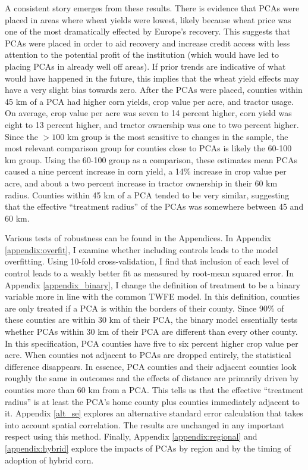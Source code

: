 \documentclass[12pt]{article}
\begin{document}
A consistent story emerges from these results.
There is evidence that PCAs were placed in areas where wheat yields were lowest, likely because wheat price was one of the most dramatically effected by Europe's recovery.
This suggests that PCAs were placed in order to aid recovery and increase credit access with less attention to the potential profit of the institution (which would have led to placing PCAs in already well off areas).
If prior trends are indicative of what would have happened in the future, this implies that the wheat yield effects may have a very slight bias towards zero.
After the PCAs were placed, counties within 45 km of a PCA had higher corn yields, crop value per acre, and tractor usage.
On average, crop value per acre was seven to 14 percent higher, corn yield was eight to 13 percent higher, and tractor ownership was one to two percent higher.
Since the $> 100$ km group is the most sensitive to changes in the sample, the most relevant comparison group for counties close to PCAs is likely the 60-100 km group. 
Using the 60-100 group as a comparison, these estimates mean PCAs caused a nine percent increase in corn yield, a 14\% increase in crop value per acre, and about a two percent increase in tractor ownership in their 60 km radius.
Counties within 45 km of a PCA tended to be very similar, suggesting that the effective ``treatment radius'' of the PCAs was somewhere between 45 and 60 km. 

Various tests of robustness can be found in the Appendices.
In Appendix \ref{appendix:overfit}, I examine whether including controls leads to the model overfitting.
Using 10-fold cross-validation, I find that inclusion of each level of control leads to a weakly better fit as measured by root-mean squared error.
In Appendix \ref{appendix_binary}, I change the definition of treatment to be a binary variable more in line with the common TWFE model.
In this definition, counties are only treated if a PCA is within the borders of their county.
Since 90\% of these counties are within 30 km of their PCA, the binary model essentially tests whether PCAs within 30 km of their PCA are different than every other county.
In this specification, PCA counties have five to six percent higher crop value per acre.
When counties not adjacent to PCAs are dropped entirely, the statistical difference disappears.
In essence, PCA counties and their adjacent counties look roughly the same in outcomes and the effects of distance are primarily driven by counties more than 60 km from a PCA.
This tells us that the effective ``treatment radius'' is at least the PCA's home county plus counties immediately adjacent to it.
Appendix \ref{alt_se} explores an alternative standard error calculation that takes into account spatial correlation.
The results are unchanged in any important respect using this method.
Finally, Appendix \ref{appendix:regional} and \ref{appendix:hybrid} explore the impacts of PCAs by region and by the timing of adoption of hybrid corn.
\end{document}
